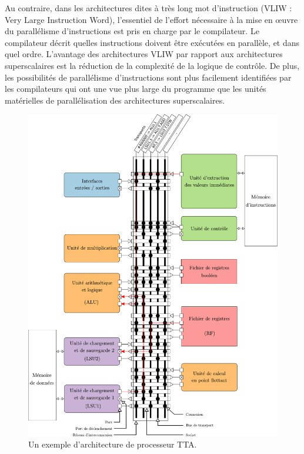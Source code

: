 Au contraire, dans les architectures dites \og à très long mot d'instruction \fg (VLIW : Very Large Instruction Word), l'essentiel de l'effort nécessaire à la mise en œuvre du parallélisme d'instructions est pris en charge par le compilateur. Le compilateur décrit quelles instructions doivent être exécutées en parallèle, et dans quel ordre. L'avantage des architectures VLIW par rapport aux architectures superscalaires est la réduction de la complexité de la logique de contrôle. De plus, les possibilités de parallélisme d'instructions sont plus facilement identifiées par les compilateurs qui ont une vue plus large du programme que les unités matérielles de parallélisation des architectures superscalaires.


\begin{figure}[htp]
\centering
\includegraphics[width=\textwidth]{main/ch4_fig/archi_tta}
\caption{Un exemple d'architecture de processeur TTA.}
\label{fig:tta_example}
\end{figure}

